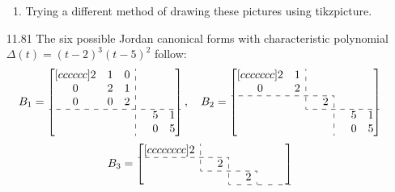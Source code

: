 \documentclass[12pt]{article}
\newcommand*{\tempb}{\multicolumn{1}{:c}{}} %
\theoremstyle{definition}
\theoremstyle{plain}
\begin{document}
\begin{enumerate}
\begin{enumerate}
	\item Trying a different method of drawing these pictures using tikzpicture.\\
	\end{enumerate}		
\item[11.81]The six possible Jordan canonical forms with characteristic polynomial $\Delta (t)=(t-2)^3(t-5)^2$ follow:\\
\[B_1=\begin{bmatrix}[cccccc]
2&1&0&\tempb&{}&{}\\
0&2&1&\tempb&{}&{}\\
0&0&2&\tempb&{}&{}\\
\cdashline{1-6}
{}&{}&{}&\tempb&5&1\\
{}&{}&{}&\tempb&0&5\\\end{bmatrix}
,\quad 
B_2=\begin{bmatrix}[ccccccc]
2&1&\tempb&{}&{}&{}&{}\\
0&2&\tempb&{}&{}&{}&{}\\
\cdashline{1-4}
{}&{}&\tempb&2&\tempb&{}&{}\\
\cdashline{3-7}
{}&{}&{}&{}&\tempb&5&1\\
{}&{}&{}&{}&\tempb&0&5\\\end{bmatrix} \]
\[ B_3=\begin{bmatrix}[cccccccc]
2&\tempb&{}&{}&{}&{}&{}&{}\\
\cdashline{1-3}
{}&\tempb&2&\tempb&{}&{}&{}&{}\\
\cdashline{2-5}
{}&{}&{}&\tempb&2&\tempb&{}&{}\\
\cdashline{4-8}

\end{bmatrix}\]
\end{enumerate}
\end{document}
